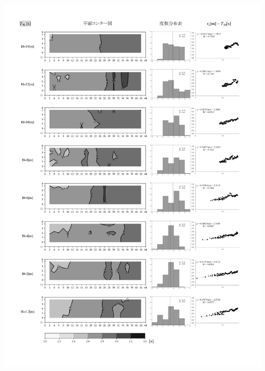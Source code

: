       \begin{minipage}{1\hsize}
        \centering
          \includegraphics[keepaspectratio,width=1\hsize,angle=0]
                          {04_att/Onkyo_rec5.pdf}
      \end{minipage}
\newpage
